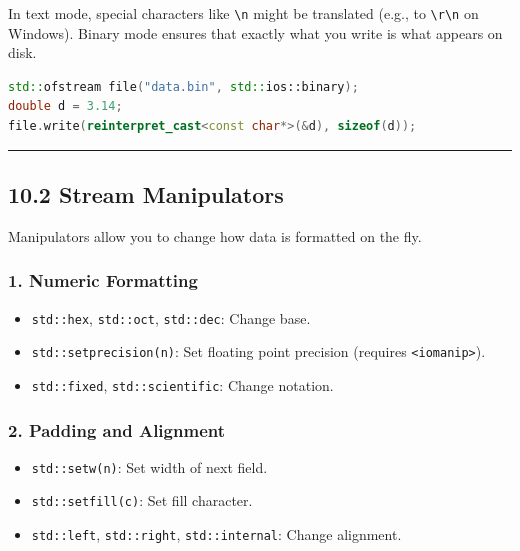 In text mode, special characters like \passthrough{\lstinline!\\n!}
might be translated (e.g., to \passthrough{\lstinline!\\r\\n!} on
Windows). Binary mode ensures that exactly what you write is what
appears on disk.

\begin{lstlisting}[language={C++}]
std::ofstream file("data.bin", std::ios::binary);
double d = 3.14;
file.write(reinterpret_cast<const char*>(&d), sizeof(d));
\end{lstlisting}

\begin{center}\rule{0.5\linewidth}{0.5pt}\end{center}

\hypertarget{stream-manipulators}{%
\subsection{10.2 Stream Manipulators}\label{stream-manipulators}}

Manipulators allow you to change how data is formatted on the fly.

\hypertarget{numeric-formatting}{%
\subsubsection{1. Numeric Formatting}\label{numeric-formatting}}

\begin{itemize}
\tightlist
\item
  \passthrough{\lstinline!std::hex!},
  \passthrough{\lstinline!std::oct!},
  \passthrough{\lstinline!std::dec!}: Change base.
\item
  \passthrough{\lstinline!std::setprecision(n)!}: Set floating point
  precision (requires \passthrough{\lstinline!<iomanip>!}).
\item
  \passthrough{\lstinline!std::fixed!},
  \passthrough{\lstinline!std::scientific!}: Change notation.
\end{itemize}

\hypertarget{padding-and-alignment}{%
\subsubsection{2. Padding and Alignment}\label{padding-and-alignment}}

\begin{itemize}
\tightlist
\item
  \passthrough{\lstinline!std::setw(n)!}: Set width of next field.
\item
  \passthrough{\lstinline!std::setfill(c)!}: Set fill character.
\item
  \passthrough{\lstinline!std::left!},
  \passthrough{\lstinline!std::right!},
  \passthrough{\lstinline!std::internal!}: Change alignment.
\end{itemize}

